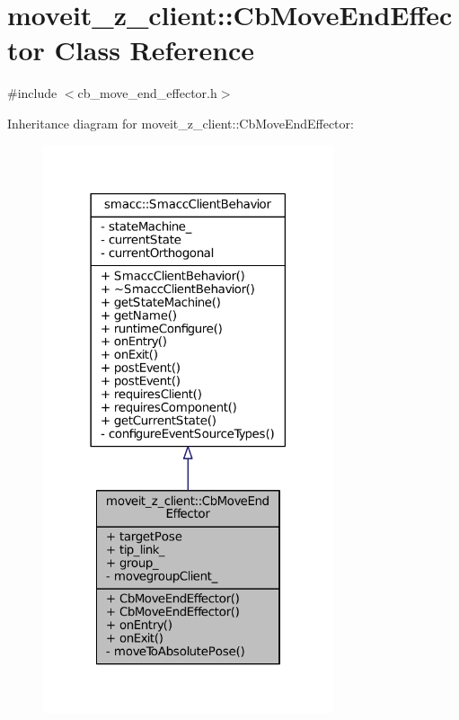\hypertarget{classmoveit__z__client_1_1CbMoveEndEffector}{}\section{moveit\+\_\+z\+\_\+client\+:\+:Cb\+Move\+End\+Effector Class Reference}
\label{classmoveit__z__client_1_1CbMoveEndEffector}


{\ttfamily \#include $<$cb\+\_\+move\+\_\+end\+\_\+effector.\+h$>$}



Inheritance diagram for moveit\+\_\+z\+\_\+client\+:\+:Cb\+Move\+End\+Effector\+:
\nopagebreak
\begin{figure}[H]
\begin{center}
\leavevmode
\includegraphics[width=242pt]{classmoveit__z__client_1_1CbMoveEndEffector__inherit__graph}
\end{center}
\end{figure}


